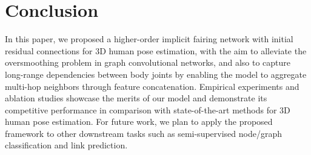 \documentclass{bmvc2k}
\begin{document}
\section{Conclusion}
In this paper, we proposed a higher-order implicit fairing network with initial residual connections for 3D human pose estimation, with the aim to alleviate the oversmoothing problem in graph convolutional networks, and also to capture long-range dependencies between body joints by enabling the model to aggregate multi-hop neighbors through feature concatenation. Empirical experiments and ablation studies showcase the merits of our model and demonstrate its competitive performance in comparison with state-of-the-art methods for 3D human pose estimation. For future work, we plan to apply the proposed framework to other downstream tasks such as semi-supervised node/graph classification and link prediction.



\end{document}
